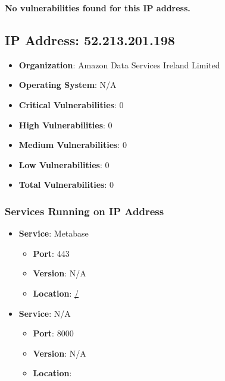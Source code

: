 \documentclass{article}
\begin{document}
\textbf{No vulnerabilities found for this IP address.}




\clearpage



\subsection*{IP Address: 52.213.201.198}

\begin{itemize}
    \item \textbf{Organization}: Amazon Data Services Ireland Limited
    \item \textbf{Operating System}:  N/A 
    \item \textbf{Critical Vulnerabilities}: 0
    \item \textbf{High Vulnerabilities}: 0
    \item \textbf{Medium Vulnerabilities}: 0
    \item \textbf{Low Vulnerabilities}: 0
    \item \textbf{Total Vulnerabilities}: 0
\end{itemize}

\subsubsection*{Services Running on IP Address}

\begin{itemize}
    
        \item \textbf{Service}: Metabase
        \begin{itemize}
            \item \textbf{Port}: 443
            \item \textbf{Version}:  N/A 
            \item \textbf{Location}: \href{ / }{ / }
        \end{itemize}
    
        \item \textbf{Service}: N/A
        \begin{itemize}
            \item \textbf{Port}: 8000
            \item \textbf{Version}:  N/A 
            \item \textbf{Location}: \href{  }{  }
        \end{itemize}
    
\end{itemize}
\end{document}
